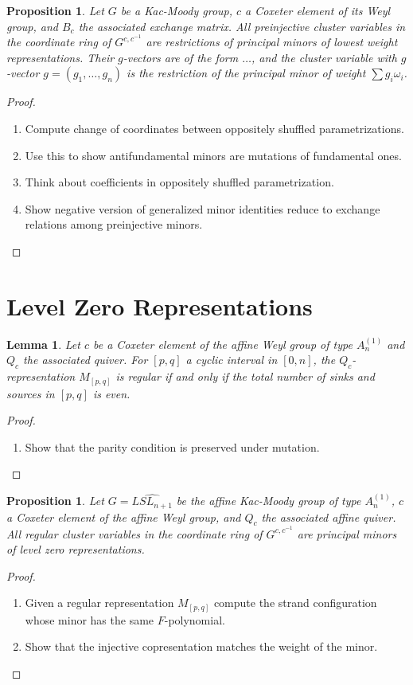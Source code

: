 \documentclass[11pt]{amsart}
\newtheorem{lemma}[theorem]{Lemma}
\newtheorem{proposition}[theorem]{Proposition}
\begin{document}
\begin{proposition}
Let $G$ be a Kac-Moody group, $c$ a Coxeter element of its Weyl group, and $B_c$ the associated exchange matrix.  All preinjective cluster variables in the coordinate ring of $G^{c,c^{-1}}$ are restrictions of principal minors of lowest weight representations.  Their $g$-vectors are of the form $\dotsc$, and the cluster variable with $g$-vector $g = (g_1,\dotsc,g_n)$ is the restriction of the principal minor of weight $\sum g_i \omega_i$.
\end{proposition}
\begin{proof}
\begin{enumerate}
\item Compute change of coordinates between oppositely shuffled parametrizations.
\item Use this to show antifundamental minors are mutations of fundamental ones.
\item Think about coefficients in oppositely shuffled parametrization.
\item Show negative version of generalized minor identities reduce to exchange relations among preinjective minors.
\end{enumerate}
\end{proof}

\section{Level Zero Representations}

\begin{lemma}
Let $c$ be a Coxeter element of the affine Weyl group of type $A_n^{(1)}$ and $Q_c$ the associated quiver.  For $[p,q]$ a cyclic interval in $[0,n]$, the $Q_c$-representation $M_{[p,q]}$ is regular if and only if the total number of sinks and sources in $[p,q]$ is even.
\end{lemma}
\begin{proof}
\begin{enumerate}
\item Show that the parity condition is preserved under mutation.
\end{enumerate}
\end{proof}

\begin{proposition}
Let $G = \widehat{LSL_{n+1}}$ be the affine Kac-Moody group of type $A_n^{(1)}$, $c$ a Coxeter element of the affine Weyl group, and $Q_c$ the associated affine quiver.  All regular cluster variables in the coordinate ring of $G^{c,c^{-1}}$ are principal minors of level zero representations.  
\end{proposition}
\begin{proof}
\begin{enumerate}
\item Given a regular representation $M_{[p,q]}$ compute the strand configuration whose minor has the same $F$-polynomial.
\item Show that the injective copresentation matches the weight of the minor.
\end{enumerate}
\end{proof}
\end{document}
